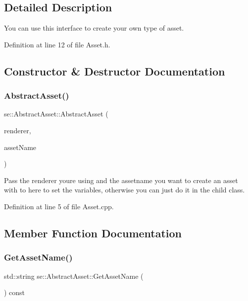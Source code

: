 \subsection{Detailed Description}
You can use this interface to create your own type of asset. 

Definition at line 12 of file Asset.\+h.



\subsection{Constructor \& Destructor Documentation}
\mbox{\label{classse_1_1_abstract_asset_acb27e3d7a54233b28ce430a67448506a}} 
\subsubsection{\texorpdfstring{Abstract\+Asset()}{AbstractAsset()}}
{\footnotesize\ttfamily se\+::\+Abstract\+Asset\+::\+Abstract\+Asset (\begin{DoxyParamCaption}\item[{\mbox{\hyperlink{classse_1_1_abstract_renderer}{Abstract\+Renderer}} $\ast$}]{renderer,  }\item[{const std\+::string \&}]{asset\+Name }\end{DoxyParamCaption})}

Pass the renderer you\textquotesingle{}re using and the assetname you want to create an asset with to here to set the variables, otherwise you can just do it in the child class. 

Definition at line 5 of file Asset.\+cpp.



\subsection{Member Function Documentation}
\mbox{\label{classse_1_1_abstract_asset_aae608bfd21c9b7a8370b0a7e37e7349c}} 
\subsubsection{\texorpdfstring{Get\+Asset\+Name()}{GetAssetName()}}
{\footnotesize\ttfamily std\+::string se\+::\+Abstract\+Asset\+::\+Get\+Asset\+Name (\begin{DoxyParamCaption}{ }\end{DoxyParamCaption}) const}

